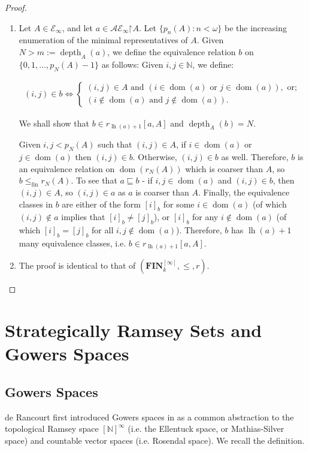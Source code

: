 \documentclass[11pt,reqno]{amsart}
\theoremstyle{plain}
\numberwithin{equation}{section}
\theoremstyle{definition}
\newcommand{\func}{\operatorname}
\newcommand{\N}{\mathbb{N}}
\newcommand{\cal}{\mathcal}
\renewcommand{\bf}{\mathbf}
\newcommand{\dom}{\func{dom}}
\newcommand{\restrictedto}{\mathord{\upharpoonright}}
\newcommand{\FIN}{\bf{FIN}}
\newcommand{\lh}{\func{lh}}
\newcommand{\depth}{\func{depth}}
\newcommand{\fin}{\mathrm{fin}}
\newcommand{\E}{\cal{E}}
\begin{document}
\begin{proof}
\begin{enumerate}
        \item Let $A \in \E_\infty$, and let $a \in \cal{AE}_\infty\restrictedto A$. Let $\{p_n(A) : n < \omega\}$ be the increasing enumeration of the minimal representatives of $A$. Given $N > m := \depth_A(a)$, we define the equivalence relation $b$ on $\{0,1,\dots,p_N(A)-1\}$ as follows: Given $i,j \in \N$, we define:
        \begin{small}
            \begin{gather*}
                (i,j) \in b \iff
                \begin{cases}
                    (i,j) \in A \text{ and } (i \in \dom(a) \text{ or } j \in \dom(a)), \text{ or}; \\
                    (i \notin \dom(a) \text{ and } j \notin \dom(a)).
                \end{cases}
            \end{gather*}
        \end{small}
        We shall show that $b \in r_{\lh(a)+1}[a,A]$ and $\depth_A(b) = N$.
        
        Given $i,j < p_N(A)$ such that $(i,j) \in A$, if $i \in \dom(a)$ or $j \in \dom(a)$ then $(i,j) \in b$. Otherwise, $(i,j) \in b$ as well. Therefore, $b$ is an equivalence relation on $\dom(r_N(A))$ which is coarser than $A$, so $b \leq_\fin r_N(A)$. To see that $a \sqsubseteq b$ - if $i,j \in \dom(a)$ and $(i,j) \in b$, then $(i,j) \in A$, so $(i,j) \in a$ as $a$ is coarser than $A$. Finally, the equivalence classes in $b$ are either of the form $[i]_b$ for some $i \in \dom(a)$ (of which $(i,j) \notin a$ implies that $[i]_b \neq [j]_b$), or $[i]_b$ for any $i \notin \dom(a)$ (of which $[i]_b = [j]_b$ for all $i,j \notin \dom(a)$). Therefore, $b$ has $\lh(a) + 1$ many equivalence classes, i.e. $b \in r_{\lh(a)+1}[a,A]$.

        \item The proof is identical to that of $(\FIN_k^{[\infty]},\leq,r)$.
    \end{enumerate}
\end{proof}

\section{Strategically Ramsey Sets and Gowers Spaces}
\subsection{Gowers Spaces} 
de Rancourt first introduced Gowers spaces in \cite{d20} as a common abstraction to the topological Ramsey space $[\N]^\infty$ (i.e. the Ellentuck space, or Mathias-Silver space) and countable vector spaces (i.e. Rosendal space). We recall the definition.
\end{document}
